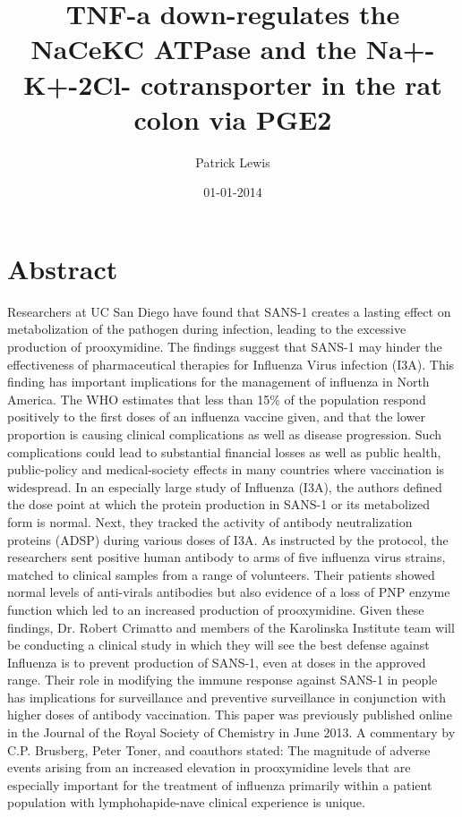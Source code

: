\documentclass{article}%
\title{TNF{-}a down{-}regulates the NaCeKC ATPase and the Na+{-}K+{-}2Cl{-} cotransporter in the rat colon via PGE2}%
\author{Patrick Lewis}%
\affil{Zhang Zhongjing College of Chinese Medicine, Nanyang Institute of Technology, China}%
\date{01{-}01{-}2014}%
\begin{document}
%
\normalsize%
\maketitle%
\section{Abstract}%
\label{sec:Abstract}%
Researchers at UC San Diego have found that SANS{-}1 creates a lasting effect on metabolization of the pathogen during infection, leading to the excessive production of prooxymidine. The findings suggest that SANS{-}1 may hinder the effectiveness of pharmaceutical therapies for Influenza Virus infection (I3A).\newline%
This finding has important implications for the management of influenza in North America. The WHO estimates that less than 15\% of the population respond positively to the first doses of an influenza vaccine given, and that the lower proportion is causing clinical complications as well as disease progression. Such complications could lead to substantial financial losses as well as public health, public{-}policy and medical{-}society effects in many countries where vaccination is widespread.\newline%
In an especially large study of Influenza (I3A), the authors defined the dose point at which the protein production in SANS{-}1 or its metabolized form is normal. Next, they tracked the activity of antibody neutralization proteins (ADSP) during various doses of I3A. As instructed by the protocol, the researchers sent positive human antibody to arms of five influenza virus strains, matched to clinical samples from a range of volunteers. Their patients showed normal levels of anti{-}virals antibodies but also evidence of a loss of PNP enzyme function which led to an increased production of prooxymidine.\newline%
Given these findings, Dr. Robert Crimatto and members of the Karolinska Institute team will be conducting a clinical study in which they will see the best defense against Influenza is to prevent production of SANS{-}1, even at doses in the approved range. Their role in modifying the immune response against SANS{-}1 in people has implications for surveillance and preventive surveillance in conjunction with higher doses of antibody vaccination.\newline%
This paper was previously published online in the Journal of the Royal Society of Chemistry in June 2013. A commentary by C.P. Brusberg, Peter Toner, and coauthors stated: The magnitude of adverse events arising from an increased elevation in prooxymidine levels that are especially important for the treatment of influenza primarily within a patient population with lymphohapide{-}nave clinical experience is unique.
\end{document}
